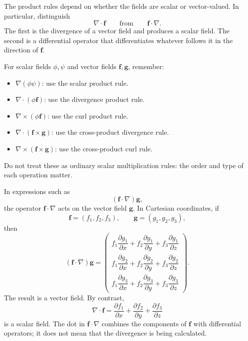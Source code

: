 \begin{mistake}
The product rules depend on whether the fields are scalar or vector-valued. In particular, distinguish
\[
\nabla\cdot\boldsymbol{f}
\qquad\text{from}\qquad
\boldsymbol{f}\cdot\nabla.
\]
The first is the divergence of a vector field and produces a scalar field. The second is a differential operator that differentiates whatever follows it in the direction of \(\boldsymbol{f}\).

For scalar fields \(\phi,\psi\) and vector fields \(\boldsymbol{f},\boldsymbol{g}\), remember:
\begin{itemize}
    \item \(\nabla(\phi\psi)\): use the scalar product rule.
    \item \(\nabla\cdot(\phi\boldsymbol{f})\): use the divergence product rule.
    \item \(\nabla\times(\phi\boldsymbol{f})\): use the curl product rule.
    \item \(\nabla\cdot(\boldsymbol{f}\times\boldsymbol{g})\): use the cross-product divergence rule.
    \item \(\nabla\times(\boldsymbol{f}\times\boldsymbol{g})\): use the cross-product curl rule.
\end{itemize}

Do not treat these as ordinary scalar multiplication rules: the order and type of each operation matter.
\end{mistake}


\begin{mistake}
In expressions such as
\[
(\boldsymbol{f}\cdot\nabla)\boldsymbol{g},
\]
the operator \(\boldsymbol{f}\cdot\nabla\) acts on the vector field \(\boldsymbol{g}\). In Cartesian coordinates, if
\[
\boldsymbol{f}=(f_1,f_2,f_3),
\qquad
\boldsymbol{g}=(g_1,g_2,g_3),
\]
then
\[
(\boldsymbol{f}\cdot\nabla)\boldsymbol{g}
=
\begin{pmatrix}
f_1\dfrac{\partial g_1}{\partial x}
+f_2\dfrac{\partial g_1}{\partial y}
+f_3\dfrac{\partial g_1}{\partial z}\\[8pt]
f_1\dfrac{\partial g_2}{\partial x}
+f_2\dfrac{\partial g_2}{\partial y}
+f_3\dfrac{\partial g_2}{\partial z}\\[8pt]
f_1\dfrac{\partial g_3}{\partial x}
+f_2\dfrac{\partial g_3}{\partial y}
+f_3\dfrac{\partial g_3}{\partial z}
\end{pmatrix}.
\]
The result is a vector field. By contrast,
\[
\nabla\cdot\boldsymbol{f}
=
\frac{\partial f_1}{\partial x}
+\frac{\partial f_2}{\partial y}
+\frac{\partial f_3}{\partial z}
\]
is a scalar field. The dot in \(\boldsymbol{f}\cdot\nabla\) combines the components of \(\boldsymbol{f}\) with differential operators; it does not mean that the divergence is being calculated.
\end{mistake}

